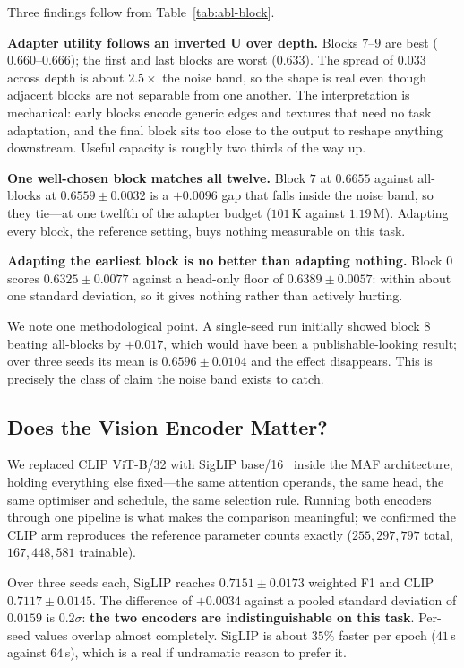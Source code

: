 \documentclass[conference]{IEEEtran}
\begin{document}
Three findings follow from Table~\ref{tab:abl-block}.

\textbf{Adapter utility follows an inverted U over depth.} Blocks $7$--$9$ are
best ($0.660$--$0.666$); the first and last blocks are worst ($0.633$). The
spread of $0.033$ across depth is about $2.5\times$ the noise band, so the shape
is real even though adjacent blocks are not separable from one another. The
interpretation is mechanical: early blocks encode generic edges and textures
that need no task adaptation, and the final block sits too close to the output
to reshape anything downstream. Useful capacity is roughly two thirds of the way
up.

\textbf{One well-chosen block matches all twelve.} Block $7$ at $0.6655$ against
all-blocks at $0.6559 \pm 0.0032$ is a $+0.0096$ gap that falls inside the noise
band, so they tie---at one twelfth of the adapter budget ($101$\,K against
$1.19$\,M). Adapting every block, the reference setting, buys nothing
measurable on this task.

\textbf{Adapting the earliest block is no better than adapting nothing.} Block
$0$ scores $0.6325 \pm 0.0077$ against a head-only floor of
$0.6389 \pm 0.0057$: within about one standard deviation, so it gives nothing
rather than actively hurting.

We note one methodological point. A single-seed run initially showed block $8$
beating all-blocks by $+0.017$, which would have been a publishable-looking
result; over three seeds its mean is $0.6596 \pm 0.0104$ and the effect
disappears. This is precisely the class of claim the noise band exists to catch.

\subsection{Does the Vision Encoder Matter?}
\label{sec:abl-encoder}

We replaced CLIP ViT-B/32 with SigLIP base/16~\cite{zhai2023} inside the MAF
architecture, holding everything else fixed---the same attention operands, the
same head, the same optimiser and schedule, the same selection rule. Running
both encoders through one pipeline is what makes the comparison meaningful; we
confirmed the CLIP arm reproduces the reference parameter counts exactly
($255{,}297{,}797$ total, $167{,}448{,}581$ trainable).

Over three seeds each, SigLIP reaches $0.7151 \pm 0.0173$ weighted F1 and CLIP
$0.7117 \pm 0.0145$. The difference of $+0.0034$ against a pooled standard
deviation of $0.0159$ is $0.2\sigma$: \textbf{the two encoders are
indistinguishable on this task}. Per-seed values overlap almost completely.
SigLIP is about $35\%$ faster per epoch ($41$\,s against $64$\,s), which is a
real if undramatic reason to prefer it.
\end{document}
